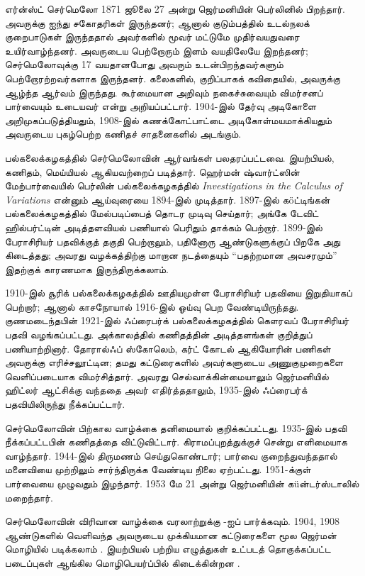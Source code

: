 \documentclass[../../../include/open-logic-section]{subfiles}
\begin{document}



எர்ன்ஸ்ட் செர்மெலோ 1871 ஜூலை 27 அன்று ஜெர்மனியின் பெர்லினில் பிறந்தார்.
அவருக்கு ஐந்து சகோதரிகள் இருந்தனர்; ஆனால் குடும்பத்தில் உடல்நலக்
குறைபாடுகள் இருந்ததால் அவர்களில் மூவர் மட்டுமே முதிர்வயதுவரை
உயிர்வாழ்ந்தனர். அவருடைய பெற்றோரும் இளம் வயதிலேயே இறந்தனர்;
செர்மெலோவுக்கு 17 வயதானபோது அவரும் உடன்பிறந்தவர்களும் பெற்றோரற்றவர்களாக
இருந்தனர். கலைகளில், குறிப்பாகக் கவிதையில், அவருக்கு ஆழ்ந்த ஆர்வம்
இருந்தது. கூர்மையான அறிவும் நகைச்சுவையும் விமர்சனப் பார்வையும்
உடையவர் என்று அறியப்பட்டார். 1904-இல் தேர்வு அடிகோளை அறிமுகப்படுத்தியதும்,
1908-இல் கணக்கோட்பாட்டை அடிகோள்மயமாக்கியதும் அவருடைய புகழ்பெற்ற
கணிதச் சாதனைகளில் அடங்கும்.

பல்கலைக்கழகத்தில் செர்மெலோவின் ஆர்வங்கள் பலதரப்பட்டவை. இயற்பியல்,
கணிதம், மெய்யியல் ஆகியவற்றைப் படித்தார். ஹெர்மன் ஷ்வார்ட்ஸின்
மேற்பார்வையில் பெர்லின் பல்கலைக்கழகத்தில் \emph{Investigations in
  the Calculus of Variations} என்னும் ஆய்வுரையை 1894-இல் முடித்தார்.
1897-இல் க\"{o}ட்டிங்கன் பல்கலைக்கழகத்தில் மேல்படிப்பைத் தொடர முடிவு
செய்தார்; அங்கே டேவிட் ஹில்பர்ட்டின் அடித்தளவியல் பணியால் பெரிதும்
தாக்கம் பெற்றார். 1899-இல் பேராசிரியர் பதவிக்குத் தகுதி பெற்றாலும்,
பதினோரு ஆண்டுகளுக்குப் பிறகே அது கிடைத்தது; அவரது வழக்கத்திற்கு
மாறான நடத்தையும் ``பதற்றமான அவசரமும்'' இதற்குக் காரணமாக
இருந்திருக்கலாம்.

1910-இல் சூரிக் பல்கலைக்கழகத்தில் ஊதியமுள்ள பேராசிரியர் பதவியை
இறுதியாகப் பெற்றார்; ஆனால் காசநோயால் 1916-இல் ஓய்வு பெற வேண்டியிருந்தது.
குணமடைந்தபின் 1921-இல் ஃப்ரைபர்க் பல்கலைக்கழகத்தில் கௌரவப்
பேராசிரியர் பதவி வழங்கப்பட்டது. அக்காலத்தில் கணிதத்தின் அடித்தளங்கள்
குறித்துப் பணியாற்றினார். தோரால்ஃப் ஸ்கோலெம், கர்ட் கோடல் ஆகியோரின்
பணிகள் அவருக்கு எரிச்சலூட்டின; தமது கட்டுரைகளில் அவர்களுடைய
அணுகுமுறைகளை வெளிப்படையாக விமர்சித்தார். அவரது செல்வாக்கின்மையாலும்
ஜெர்மனியில் ஹிட்லர் ஆட்சிக்கு வந்ததை அவர் எதிர்த்ததாலும்,
1935-இல் ஃப்ரைபர்க் பதவியிலிருந்து நீக்கப்பட்டார்.

செர்மெலோவின் பிற்கால வாழ்க்கை தனிமையால் குறிக்கப்பட்டது. 1935-இல்
பதவி நீக்கப்பட்டபின் கணிதத்தை விட்டுவிட்டார். கிராமப்புறத்துக்குச்
சென்று எளிமையாக வாழ்ந்தார். 1944-இல் திருமணம் செய்துகொண்டார்;
பார்வை குறைந்துவந்ததால் மனைவியை முற்றிலும் சார்ந்திருக்க வேண்டிய
நிலை ஏற்பட்டது. 1951-க்குள் பார்வையை முழுவதும் இழந்தார். 1953
மே 21 அன்று ஜெர்மனியின் க\"{u}ன்டர்ஸ்டாலில் மறைந்தார்.

\begin{reading}
செர்மெலோவின் விரிவான வாழ்க்கை வரலாற்றுக்கு \citet{Ebbinghaus2015}-ஐப்
பார்க்கவும். 1904, 1908 ஆண்டுகளில் வெளிவந்த அவருடைய முக்கியமான
கட்டுரைகளை மூல ஜெர்மன் மொழியில் படிக்கலாம்
\citep{Zermelo1904,Zermelo1908}. இயற்பியல் பற்றிய எழுத்துகள்
உட்படத் தொகுக்கப்பட்ட படைப்புகள் ஆங்கில மொழிபெயர்ப்பில் கிடைக்கின்றன
\citep{Ebbinghaus2010,Ebbinghaus2013}.
\end{reading}
\end{document}
